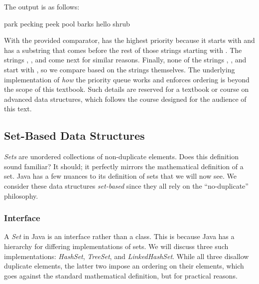 The output is as follows:

\begin{verbnobox}[\small]
park
pecking
peek
pool
barks
hello
shrub
\end{verbnobox}

With the provided comparator,  has the highest priority because it starts with  and has a substring that comes before the rest of those strings starting with . 
The strings , , and  come next for similar reasons. 
Finally, none of the strings , , and  start with , so we compare based on the strings themselves. 
The underlying implementation of \emph{how} the priority queue works and enforces ordering is beyond the scope of this textbook. 
Such details are reserved for a textbook or course on advanced data structures, which follows the course designed for the audience of this text.

\subsection{Set-Based Data Structures}
\emph{Sets} are unordered collections of non-duplicate elements. 
Does this definition sound familiar? 
It should; it perfectly mirrors the mathematical definition of a set. 
Java has a few nuances to its definition of sets that we will now see. 
We consider these data structures \emph{set-based} since they all rely on the ``no-duplicate'' philosophy.

\subsubsection*{ Interface}
A \emph{Set} in Java is an interface rather than a class. 
This is because Java has a hierarchy for differing implementations of sets. 
We will discuss three such implementations: \emph{HashSet}, \emph{TreeSet}, and \emph{LinkedHashSet}. 
While all three disallow duplicate elements, the latter two impose an ordering on their elements, which goes against the standard mathematical definition, but for practical reasons.

